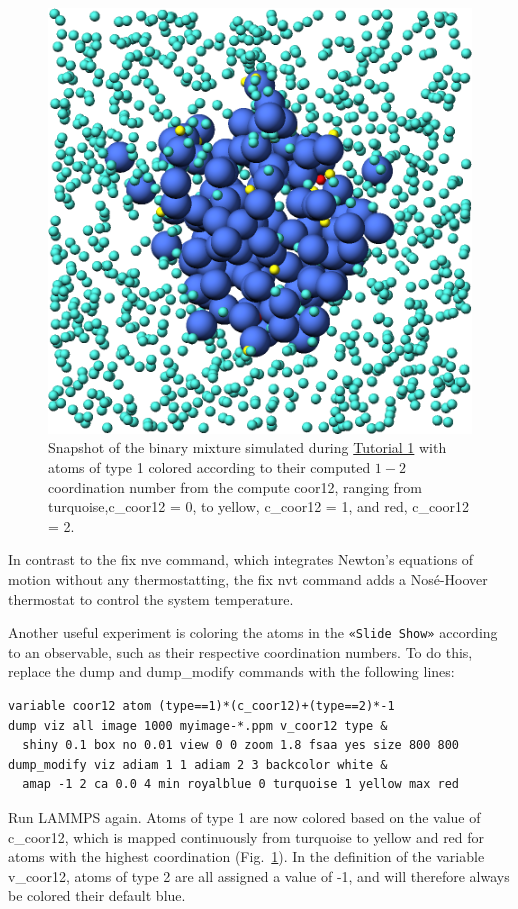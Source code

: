\documentclass[9pt,tutorial]{livecoms}
\newcommand{\lmpcmd}[1]{\colorbox{listing}{\textcolor{command}{\small{#1}}}} %
\newcommand{\guicmd}[1]{\textcolor{command}{\texttt{«#1»}}} %
\begin{document}
\begin{figure}
\centering
\includegraphics[width=0.50\linewidth]{LJ-coords}
\caption{Snapshot of the binary mixture simulated
  during \hyperref[lennard-jones-label]{Tutorial 1} with atoms of type 1
  colored according to their computed $1-2$ coordination
  number from the compute \lmpcmd{coor12}, ranging from turquoise,\lmpcmd{c\_coor12 = 0},
  to yellow, \lmpcmd{c\_coor12 = 1}, and red, \lmpcmd{c\_coor12 = 2}.}
\label{fig:coords-viz}
\end{figure}

\begin{note}
{\color{blue}
In contrast to the \lmpcmd{fix nve} command, which integrates Newton's equations
of motion without any thermostatting, the \lmpcmd{fix nvt} command adds a Nosé-Hoover
thermostat to control the system temperature.}
\end{note}

Another useful experiment is coloring the atoms in the \guicmd{Slide Show}
according to an observable, such as their respective coordination
numbers.  To do this, replace the
\lmpcmd{dump} and \lmpcmd{dump\_modify} commands with the following lines:
\begin{lstlisting}
variable coor12 atom (type==1)*(c_coor12)+(type==2)*-1
dump viz all image 1000 myimage-*.ppm v_coor12 type &
  shiny 0.1 box no 0.01 view 0 0 zoom 1.8 fsaa yes size 800 800
dump_modify viz adiam 1 1 adiam 2 3 backcolor white &
  amap -1 2 ca 0.0 4 min royalblue 0 turquoise 1 yellow max red
\end{lstlisting}
Run LAMMPS again.  Atoms of type 1 are now colored based on the value
of \lmpcmd{c\_coor12}, which is mapped continuously from turquoise to yellow
and red for atoms with the highest coordination (Fig.~\ref{fig:coords-viz}).
In the definition of the variable \lmpcmd{v\_coor12}, atoms of type 2 are
all assigned a value of -1, and will therefore always be colored their default blue.
\end{document}
